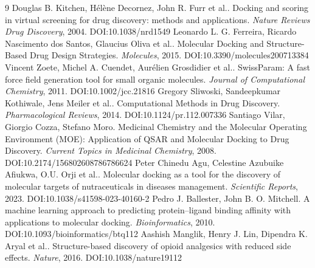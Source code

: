 \documentclass[11pt]{article}
\begin{document}
\begin{thebibliography}{9}
 Douglas B. Kitchen, Hélène Decornez, John R. Furr et al.. Docking and scoring in virtual screening for drug discovery: methods and applications. \emph{Nature Reviews Drug Discovery}, 2004. DOI:10.1038/nrd1549
 Leonardo L. G. Ferreira, Ricardo Nascimento dos Santos, Glaucius Oliva et al.. Molecular Docking and Structure-Based Drug Design Strategies. \emph{Molecules}, 2015. DOI:10.3390/molecules200713384
 Vincent Zoete, Michel A. Cuendet, Aurélien Grosdidier et al.. SwissParam: A fast force field generation tool for small organic molecules. \emph{Journal of Computational Chemistry}, 2011. DOI:10.1002/jcc.21816
 Gregory Sliwoski, Sandeepkumar Kothiwale, Jens Meiler et al.. Computational Methods in Drug Discovery. \emph{Pharmacological Reviews}, 2014. DOI:10.1124/pr.112.007336
 Santiago Vilar, Giorgio Cozza, Stefano Moro. Medicinal Chemistry and the Molecular Operating Environment (MOE): Application of QSAR and Molecular Docking to Drug Discovery. \emph{Current Topics in Medicinal Chemistry}, 2008. DOI:10.2174/156802608786786624
 Peter Chinedu Agu, Celestine Azubuike Afiukwa, O.U. Orji et al.. Molecular docking as a tool for the discovery of molecular targets of nutraceuticals in diseases management. \emph{Scientific Reports}, 2023. DOI:10.1038/s41598-023-40160-2
 Pedro J. Ballester, John B. O. Mitchell. A machine learning approach to predicting protein–ligand binding affinity with applications to molecular docking. \emph{Bioinformatics}, 2010. DOI:10.1093/bioinformatics/btq112
 Aashish Manglik, Henry J. Lin, Dipendra K. Aryal et al.. Structure-based discovery of opioid analgesics with reduced side effects. \emph{Nature}, 2016. DOI:10.1038/nature19112
\end{thebibliography}
\end{document}

